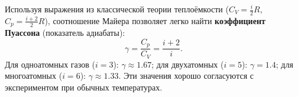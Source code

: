 \begin{remark}
Используя выражения из классической теории теплоёмкости ($C_V = \frac{i}{2}R$, $C_p = \frac{i+2}{2}R$), соотношение Майера позволяет легко найти \textbf{коэффициент Пуассона} (показатель адиабаты):
\begin{equation}
    \gamma = \frac{C_p}{C_V} = \frac{i+2}{i}.
\end{equation}
Для одноатомных газов ($i=3$): $\gamma \approx 1.67$; для двухатомных ($i=5$): $\gamma = 1.4$; для многоатомных ($i=6$): $\gamma \approx 1.33$. Эти значения хорошо согласуются с экспериментом при обычных температурах.
\end{remark}
